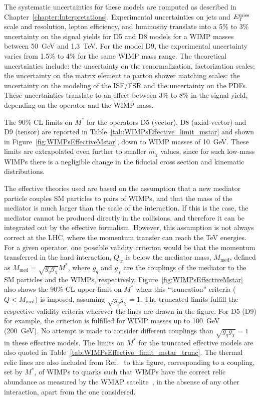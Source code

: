 The systematic uncertainties for these models are computed as described in Chapter~\ref{chapter:Interpretations}.
Experimental uncertainties on jets and $E_{\mathrm{T}}^{\mathrm{miss}}$ scale and resolution, lepton efficiency, and luminosity translate into a 5\% to 3\% uncertainty on the signal yields for D5 and D8 models for a WIMP masses between 50~GeV and 1.3~TeV.
For the model D9, the experimental uncertainty varies from 1.5\% to 4\% for the same WIMP mass range.
The theoretical uncertainties include: the uncertainty on the renormalization, factorization scales; the uncertainty on the matrix element to parton shower matching scales; the uncertainty on the modeling of the ISF/FSR and the uncertainty on the PDFs.
These uncertainties translate to an effect between 3\% to 8\% in the signal yield, depending on the operator and the WIMP mass.
    
The 90\% CL limits on $M^{\ast}$ for the operators D5 (vector), D8 (axial-vector) and D9 (tensor) are reported in Table~\ref{tab:WIMPsEffective_limit_mstar} and shown in Figure~\ref{fig:WIMPsEffectiveMstar}, down to WIMP masses of 10~GeV.
These limits are extrapolated even further to smaller $m_{\chi}$ values, since for such low-mass WIMPs there is a negligible change in the fiducial cross section and kinematic distributions.



The effective theories used are based on the assumption that a new mediator particle couples SM particles to pairs of WIMPs, and that the mass of the mediator is much larger than the scale of the interaction.
If this is the case, the mediator cannot be produced directly in the collisions, and therefore it can be integrated out by the effective formalism.
However, this assumption is not always correct at the LHC, where the momentum transfer can reach the TeV energies.
For a given operator, one possible validity criterion would be that the momentum transferred in the hard interaction, $Q_{\text{tr}}$ is below the mediator mass, $M_{\text{med}}$, defined as $M_{\text{med}} = \sqrt{g_{q} g_{\chi}} M^{\ast}$, where $g_{q}$ and $g_{\chi}$ are the couplings of the mediator to the SM particles and the WIMPs, respectively.
Figure~\ref{fig:WIMPsEffectiveMstar} also shows the 90\% CL upper limit on $M^{\ast}$ when this ``truncation'' criteria ($Q<M_{\text{med}}$) is imposed, assuming $\sqrt{g_{q} g_{\chi}} = 1$.
The truncated limits fulfill the respective validity criteria wherever the lines are drawn in the figure.
For D5 (D9) for example, the criterion is fulfilled for WIMP masses up to 100~GeV (200~GeV).
No attempt is made to consider different couplings than $\sqrt{g_{q} g_{\chi}} = 1$ in these effective models.
The limits on $M^{\ast}$ for the truncated effective models are also quoted in Table~\ref{tab:WIMPsEffective_limit_mstar_trunc}.
The thermal relic lines are also included from Ref.~\cite{Goodman:2010ku} to this figure, corresponding to a coupling, set by $M^{\ast}$, of WIMPs to quarks such that WIMPs have the correct relic abundance as measured by the WMAP satelite~\cite{Larson:2010gs}, in the absense of any other interaction, apart from the one considered.

